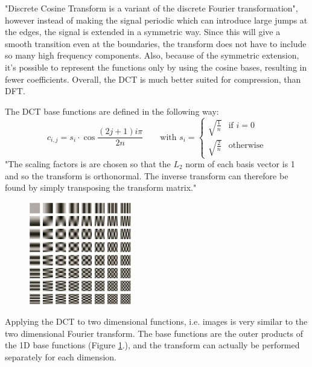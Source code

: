       "Discrete Cosine Transform is a variant of the discrete Fourier transformation", however instead of making the signal periodic which can introduce large jumps at the edges, the signal is extended in a symmetric way. Since this will give a smooth transition even at the boundaries, the transform does not have to include so many high frequency components. Also, because of the symmetric extension, it's possible to represent the functions only by using the cosine bases, resulting in fewer coefficients. Overall, the DCT is much better suited for compression, than DFT.

      The DCT base functions are defined in the following way:
      \begin{equation}
      c_{i,j} = s_i \cdot \cos \frac{(2j+1)i\pi}{2n} \qquad \text{with } s_i = 
          \begin{cases}
            \sqrt{\frac{1}{n}} & \text{if } i=0 \\
            \sqrt{\frac{2}{n}} & \text{otherwise}
          \end{cases}
      \end{equation}
      "The scaling factors is are chosen so that the $L_2$ norm of each basis vector is 1 and so the transform is orthonormal. The inverse transform can therefore be found by simply transposing the transform matrix."

      \begin{figure}
        \centering
        \includegraphics[width=0.4\textwidth]{DCT_bases}
        \label{fig:DCT_bases}
      \end{figure}

      Applying the DCT to two dimensional functions, i.e. images is very similar to the two dimensional Fourier transform. The base functions are the outer products of the 1D base functions (Figure \ref{fig:DCT_bases}.), and the transform can actually be performed separately for each dimension.

